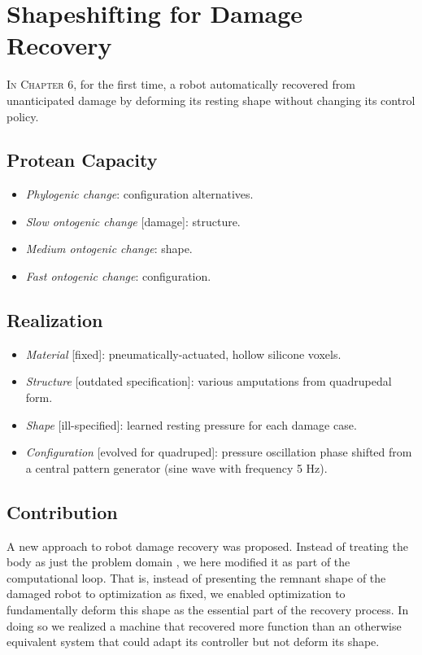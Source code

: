 \section{Shapeshifting for Damage Recovery}


\textsc{In Chapter 6,}
for the first time, a robot automatically recovered from unanticipated damage by deforming its resting shape without changing its control policy.

\subsection{Protean Capacity}

\begin{itemize}
    \item \textit{Phylogenic change}: configuration alternatives.
    \item \textit{Slow ontogenic change} [damage]: structure.
    \item \textit{Medium ontogenic change}: shape.
    \item \textit{Fast ontogenic change}: configuration.
\end{itemize}


\subsection{Realization}

\begin{itemize}
    \item \textit{Material} [fixed]: pneumatically-actuated, hollow silicone voxels.
    \item \textit{Structure} [outdated specification]: various amputations from quadrupedal form.
    \item \textit{Shape} [ill-specified]: learned resting pressure for each damage case.
    \item \textit{Configuration} [evolved for quadruped]: pressure oscillation phase shifted from a central pattern generator (sine wave with frequency 5 Hz).
\end{itemize}



\subsection{Contribution}



A new approach to robot damage recovery was proposed.
Instead of treating the body as just the problem domain \cite{bongard2006resilient,cully2015robots}, we here modified it as part of the computational loop.
That is, 
instead of presenting the remnant shape of the damaged robot to optimization as 
fixed, we enabled optimization to fundamentally deform this shape as the essential part of the recovery process.
In doing so we realized a machine that recovered more function than an otherwise equivalent system that could adapt its controller but not deform its shape.

